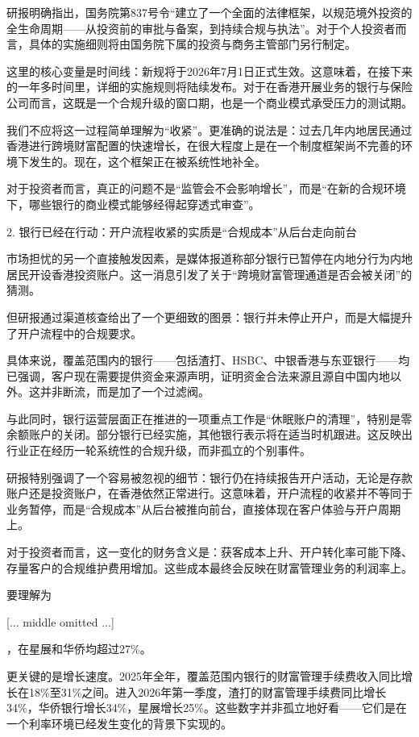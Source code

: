\documentclass[11pt]{ctexart}
\begin{document}
研报明确指出，国务院第837号令“建立了一个全面的法律框架，以规范境外投资的全生命周期——从投资前的审批与备案，到持续合规与执法”。对于个人投资者而言，具体的实施细则将由国务院下属的投资与商务主管部门另行制定。

这里的核心变量是时间线：新规将于2026年7月1日正式生效。这意味着，在接下来的一年多时间里，详细的实施规则将陆续发布。对于在香港开展业务的银行与保险公司而言，这既是一个合规升级的窗口期，也是一个商业模式承受压力的测试期。

我们不应将这一过程简单理解为“收紧”。更准确的说法是：过去几年内地居民通过香港进行跨境财富配置的快速增长，在很大程度上是在一个制度框架尚不完善的环境下发生的。现在，这个框架正在被系统性地补全。

对于投资者而言，真正的问题不是“监管会不会影响增长”，而是“在新的合规环境下，哪些银行的商业模式能够经得起穿透式审查”。

2. 银行已经在行动：开户流程收紧的实质是“合规成本”从后台走向前台

市场担忧的另一个直接触发因素，是媒体报道称部分银行已暂停在内地分行为内地居民开设香港投资账户。这一消息引发了关于“跨境财富管理通道是否会被关闭”的猜测。

但研报通过渠道核查给出了一个更细致的图景：银行并未停止开户，而是大幅提升了开户流程中的合规要求。

具体来说，覆盖范围内的银行——包括渣打、HSBC、中银香港与东亚银行——均已强调，客户现在需要提供资金来源声明，证明资金合法来源且源自中国内地以外。这并非断流，而是加了一个过滤阀。

与此同时，银行运营层面正在推进的一项重点工作是“休眠账户的清理”，特别是零余额账户的关闭。部分银行已经实施，其他银行表示将在适当时机跟进。这反映出行业正在经历一轮系统性的合规升级，而非孤立的个别事件。

研报特别强调了一个容易被忽视的细节：银行仍在持续报告开户活动，无论是存款账户还是投资账户，在香港依然正常进行。这意味着，开户流程的收紧并不等同于业务暂停，而是“合规成本”从后台被推向前台，直接体现在客户体验与开户周期上。

对于投资者而言，这一变化的财务含义是：获客成本上升、开户转化率可能下降、存量客户的合规维护费用增加。这些成本最终会反映在财富管理业务的利润率上。

要理解为

[... middle omitted ...]

，在星展和华侨均超过27\%。

更关键的是增长速度。2025年全年，覆盖范围内银行的财富管理手续费收入同比增长在18\%至31\%之间。进入2026年第一季度，渣打的财富管理手续费同比增长34\%，华侨银行增长34\%，星展增长25\%。这些数字并非孤立地好看——它们是在一个利率环境已经发生变化的背景下实现的。
\end{document}
